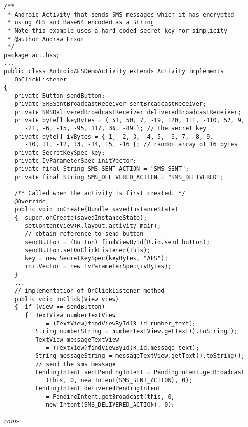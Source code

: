 \begin{figure*}\begin{program}\begin{verbatim}
/**
 * Android Activity that sends SMS messages which it has encrypted
 * using AES and Base64 encoded as a String
 * Note this example uses a hard-coded secret key for simplicity
 * @author Andrew Ensor
 */
package aut.hss;
...
public class AndroidAESDemoActivity extends Activity implements
   OnClickListener
{
   private Button sendButton;
   private SMSSentBroadcastReceiver sentBroadcastReceiver;
   private SMSDeliveredBroadcastReceiver deliveredBroadcastReceiver;
   private byte[] keyBytes = { 51, 50, 7, -19, 120, 111, -110, 52, 9,
      -21, -6, -15, -95, 117, 36, -89 }; // the secret key
   private byte[] ivBytes = { 1, -2, 3, -4, 5, -6, 7, -8, 9,
      -10, 11, -12, 13, -14, 15, -16 }; // random array of 16 bytes
   private SecretKeySpec key;
   private IvParameterSpec initVector;
   private final String SMS_SENT_ACTION = "SMS_SENT";
   private final String SMS_DELIVERED_ACTION = "SMS_DELIVERED";

   /** Called when the activity is first created. */
   @Override
   public void onCreate(Bundle savedInstanceState)
   {  super.onCreate(savedInstanceState);
      setContentView(R.layout.activity_main);
      // obtain reference to send button
      sendButton = (Button) findViewById(R.id.send_button);
      sendButton.setOnClickListener(this);
      key = new SecretKeySpec(keyBytes, "AES");
      initVector = new IvParameterSpec(ivBytes);
   }
   ...
   // implementation of OnClickListener method
   public void onClick(View view)
   {  if (view == sendButton)
      {  TextView numberTextView
            = (TextView)findViewById(R.id.number_text);
         String numberString = numberTextView.getText().toString();
         TextView messageTextView
            = (TextView)findViewById(R.id.message_text);
         String messageString = messageTextView.getText().toString();
         // send the sms message
         PendingIntent sentPendingIntent = PendingIntent.getBroadcast
            (this, 0, new Intent(SMS_SENT_ACTION), 0);
         PendingIntent deliveredPendingIntent
            = PendingIntent.getBroadcast(this, 0,
            new Intent(SMS_DELIVERED_ACTION), 0);
\end{verbatim}\hfill \emph{cont-}\end{program}\end{figure*}%
